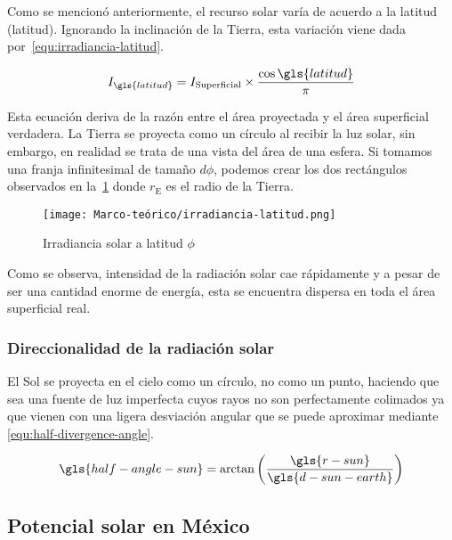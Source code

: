 			Como se mencionó anteriormente, el recurso solar varía de acuerdo a la latitud (\gls{latitud}). Ignorando la inclinación de la Tierra, esta variación viene dada por~\eqref{equ:irradiancia-latitud}.
			
			\begin{equation}
				\label{equ:irradiancia-latitud}
				I_{\gls{latitud}} = I_{\text{Superficial}} \times \dfrac{\cos{\gls{latitud}}}{\pi}
			\end{equation}
			
			Esta ecuación deriva de la razón entre el área proyectada y el área superficial verdadera. La Tierra se proyecta como un círculo al recibir la luz solar, sin embargo, en realidad se trata de una vista del área de una esfera. Si tomamos una franja infinitesimal de tamaño $d\phi$, podemos crear los dos rectángulos observados en la~\cref{fig:irradiancia-latitud} donde $r_{\text{E}} $ es el radio de la Tierra.
			
			\begin{figure}
				\centering
				\texttt{[image: Marco-teórico/irradiancia-latitud.png]}
				\caption{Irradiancia solar a latitud $\phi$}
				\label{fig:irradiancia-latitud}
			\end{figure}
			
			Como se observa, intensidad de la radiación solar cae rápidamente y a pesar de ser una cantidad enorme de energía, esta se encuentra dispersa en toda el área superficial real.
		
		\subsubsection{Direccionalidad de la radiación solar}
			
			El Sol se proyecta en el cielo como un círculo, no como un punto, haciendo que sea una fuente de luz imperfecta cuyos rayos no son perfectamente colimados ya que vienen con una ligera desviación angular que se puede aproximar mediante \eqref{equ:half-divergence-angle}.
			
			\begin{equation}\label{equ:half-divergence-angle}
				\gls{half-angle-sun} = \arctan\left(\dfrac{\gls{r-sun}}{\gls{d-sun-earth}}\right)
			\end{equation}
		
	\subsection{Potencial solar en México}

